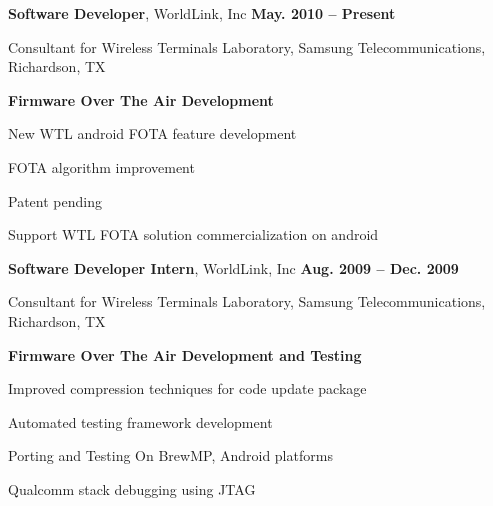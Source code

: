 \documentclass[overlapped, line]{resume}
\begin{document}
\begin{resume}
         {\bf Software Developer}, WorldLink, Inc \hfill {\bf May. 2010 -- Present}\\
         \vspace{-10pt}      %
         \begin{list2}
         \item Consultant for Wireless Terminals Laboratory, Samsung Telecommunications, Richardson, TX
         \item \textbf{Firmware Over The Air Development}
           \begin{list2}
           \item New WTL android FOTA feature development
           \item FOTA algorithm improvement
           \begin{list2}
           \item Patent pending
           \end{list2}
           \end{list2}
           \item Support WTL FOTA solution commercialization on android
         \end{list2}  \vspace{-5pt}

         {\bf Software Developer Intern}, WorldLink, Inc \hfill {\bf Aug. 2009 -- Dec. 2009}\\
         \vspace{-10pt}      %
         \begin{list2}
         \item Consultant for Wireless Terminals Laboratory, Samsung Telecommunications, Richardson, TX
         \item \textbf{Firmware Over The Air Development and Testing}
           \begin{list2}
           \item Improved compression techniques for code update package
           \item Automated testing framework development
           \item Porting and Testing On BrewMP, Android platforms
           \item Qualcomm stack debugging using JTAG
           \end{list2}

         \end{list2}  \vspace{-5pt}



\end{resume}
\end{document}
